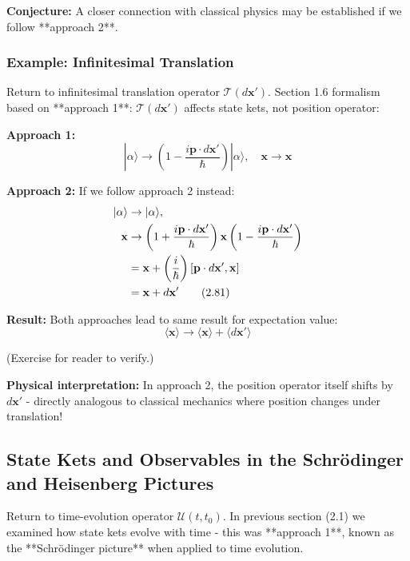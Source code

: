\documentclass[11pt,a4paper]{article}
\begin{document}
\textbf{Conjecture:} A closer connection with classical physics may be established if we follow **approach 2**.

\subsubsection{Example: Infinitesimal Translation}

Return to infinitesimal translation operator $\mathcal{T}(d\mathbf{x}')$. Section 1.6 formalism based on **approach 1**: $\mathcal{T}(d\mathbf{x}')$ affects state kets, not position operator:

\textbf{Approach 1:}
\begin{equation}
|\alpha\rangle \to \left(1 - \frac{i\mathbf{p} \cdot d\mathbf{x}'}{\hbar}\right)|\alpha\rangle, \quad \mathbf{x} \to \mathbf{x}
\tag{2.80}
\end{equation}

\textbf{Approach 2:}
If we follow approach 2 instead:
\begin{align}
|\alpha\rangle &\to |\alpha\rangle, \notag \\
\mathbf{x} &\to \left(1 + \frac{i\mathbf{p} \cdot d\mathbf{x}'}{\hbar}\right)\mathbf{x}\left(1 - \frac{i\mathbf{p} \cdot d\mathbf{x}'}{\hbar}\right) \notag \\
&= \mathbf{x} + \left(\frac{i}{\hbar}\right)[\mathbf{p} \cdot d\mathbf{x}', \mathbf{x}] \notag \\
&= \mathbf{x} + d\mathbf{x}'
\tag{2.81}
\end{align}

\textbf{Result:} Both approaches lead to same result for expectation value:
\begin{equation}
\langle\mathbf{x}\rangle \to \langle\mathbf{x}\rangle + \langle d\mathbf{x}'\rangle
\tag{2.82}
\end{equation}

(Exercise for reader to verify.)

\textbf{Physical interpretation:} In approach 2, the position operator itself shifts by $d\mathbf{x}'$ - directly analogous to classical mechanics where position changes under translation!

\subsection{State Kets and Observables in the Schrödinger and Heisenberg Pictures}

Return to time-evolution operator $\mathscr{U}(t, t_0)$. In previous section (2.1) we examined how state kets evolve with time - this was **approach 1**, known as the **Schrödinger picture** when applied to time evolution.
\end{document}
